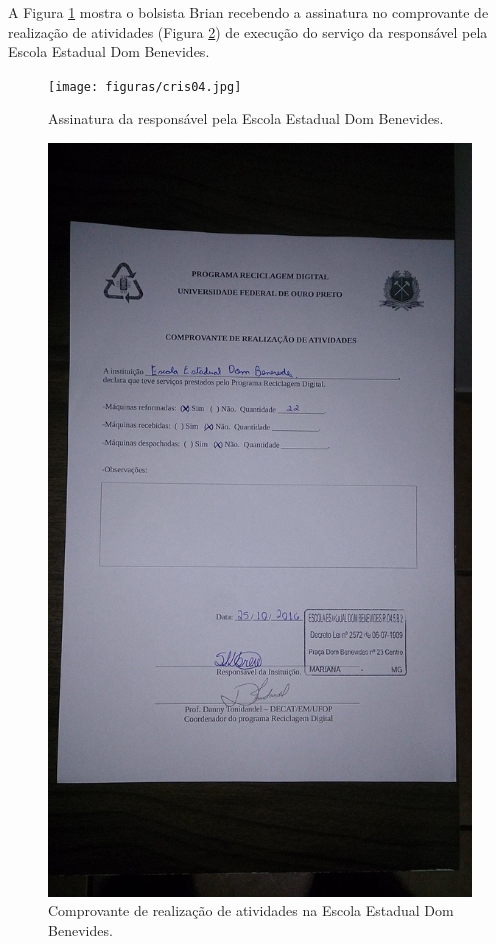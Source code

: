 \documentclass[
	12pt,				%
	openright,			%
	oneside,			%
	a4paper,			%
	english,			%
	spanish,			%
	brazil,				%
	]{abntex2}
\begin{document}
A Figura \ref{fig:tela4} mostra o bolsista Brian recebendo a assinatura no comprovante de realização de atividades (Figura \ref{fig:tela9}) de execução do serviço da responsável pela Escola Estadual Dom Benevides.

\begin{figure}[H]
	\centering
	\texttt{[image: figuras/cris04.jpg]}
	\caption{Assinatura da responsável pela Escola Estadual Dom Benevides.}
	\label{fig:tela4}
\end{figure}

\begin{figure}[H]
	\centering
	\includegraphics[scale=0.3]{figuras/cris09.jpg}
	\caption{Comprovante de realização de atividades na Escola Estadual Dom Benevides.}
	\label{fig:tela9}
\end{figure}
\end{document}
